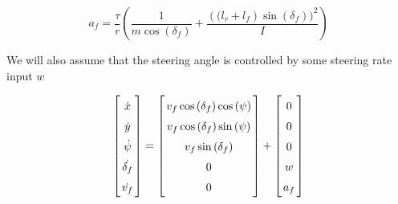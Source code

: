 \documentclass{article}
\theoremstyle{remark}
\theoremstyle{definition}
\begin{document}
$$ a_f = \frac{\tau}{r} \left ( \frac {1} {m \cos {( \delta_f) }} + \frac {\left((l_r+l_f\right)\sin {( \delta_f) } )^2} {I} \right ) $$

We will also assume that the steering angle is controlled by some steering rate input $w$

$$ \left \lbrack \arraycolsep=1.4pt\def\arraystretch{1.5} \begin{array}{c}
    \dot{x} \\
    \dot{y} \\
    \dot{\psi} \\
    \dot{\delta_f} \\
    \dot{v_f}
\end{array} \right \rbrack  = \left \lbrack \arraycolsep=1.4pt\def\arraystretch{1.5} \begin{array}{c}
    v_f \cos {( \delta_f) } \cos{( \psi )} \\
    v_f \cos {( \delta_f) } \sin{( \psi )} \\
    v_f \sin {( \delta_f) } \\
    0 \\
    0
\end{array} \right \rbrack + \left \lbrack \arraycolsep=1.4pt\def\arraystretch{1.5} \begin{array}{c}
    0 \\
    0 \\
    0 \\
    w \\
    a_f
\end{array} \right \rbrack $$
\end{document}
